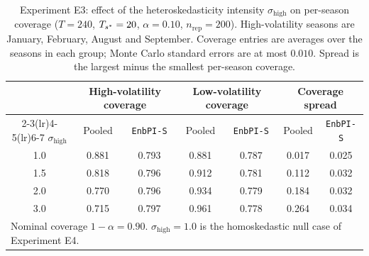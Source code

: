 \begin{table}[ht]
\centering
\caption{Experiment E3: effect of the heteroskedasticity
         intensity $\sigma_{\mathrm{high}}$ on per-season
         coverage ($T = 240$, $T_{s^*} = 20$, $\alpha = 0.10$,
         $n_{\mathrm{rep}} = 200$).  High-volatility seasons are
         January, February, August and September.  Coverage
         entries are averages over the seasons in each group;
         Monte Carlo standard errors are at most $0.010$.
         Spread is the largest minus the smallest per-season
         coverage.}
\label{tab:e3_intensity}
\begin{tabular}{c cc cc cc}
\toprule
 & \multicolumn{2}{c}{High-volatility coverage} & \multicolumn{2}{c}{Low-volatility coverage} & \multicolumn{2}{c}{Coverage spread} \\
\cmidrule(lr){2-3}\cmidrule(lr){4-5}\cmidrule(lr){6-7}
$\sigma_{\mathrm{high}}$ & Pooled & \texttt{EnbPI-S} & Pooled & \texttt{EnbPI-S} & Pooled & \texttt{EnbPI-S} \\
\midrule
1.0 & 0.881 & 0.793 & 0.881 & 0.787 & 0.017 & 0.025 \\
1.5 & 0.818 & 0.796 & 0.912 & 0.781 & 0.112 & 0.032 \\
2.0 & 0.770 & 0.796 & 0.934 & 0.779 & 0.184 & 0.032 \\
3.0 & 0.715 & 0.797 & 0.961 & 0.778 & 0.264 & 0.034 \\
\bottomrule
\multicolumn{7}{l}{\footnotesize Nominal coverage $1-\alpha = 0.90$.  $\sigma_{\mathrm{high}} = 1.0$ is the homoskedastic null case of Experiment E4.}\\
\end{tabular}
\end{table}
